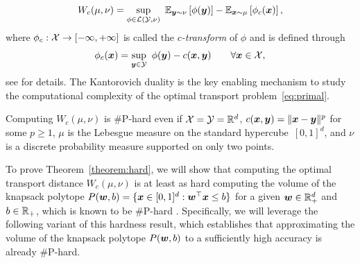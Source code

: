 \documentclass[11pt, a4paper, oneside, reqno]{article}
\begin{document}
	\begin{equation}
	\label{eq:ctans_dual}
	W_c(\mu, \nu) =\sup_{\phi \in \mathcal{L}(\mathcal{Y}, \nu)} ~ \displaystyle \mathbb{E}_{\boldsymbol y \sim \nu}\left[\phi(\boldsymbol y)\right] - \mathbb{E}_{\boldsymbol x \sim \mu}\left[ \phi_c(\boldsymbol x) \right],
	\end{equation}
	where $\phi_c:\mathcal{X}\rightarrow [-\infty,+\infty]$ is called the \textit{$c$-transform} of $\phi$ and is defined through
	\begin{equation}
	\label{eq:$c$-transform}
	\phi_c(\boldsymbol x) = \sup_{\boldsymbol y \in \mathcal{Y}} ~ \phi(\boldsymbol y) - c(\boldsymbol x, \boldsymbol y) \qquad \forall \boldsymbol x \in \mathcal{X},
	\end{equation}
	see \citet[\S~5]{villani} for details. The Kantorovich duality is the key enabling mechanism to study the computational complexity of the optimal transport problem~\eqref{eq:primal}. 
	
	\begin{theorem}
		\label{theorem:hard}
		Computing $W_c(\mu, \nu)$ is \#P-hard even if $\mathcal{X}=\mathcal{Y}=\mathbb{R}^d$, $c(\boldsymbol x, \boldsymbol y) = \|\boldsymbol x-\boldsymbol y\|^{p}$ for some $p\geq 1$, $\mu$ is the Lebesgue measure on the standard hypercube~$[0,1]^d$, and $\nu$ is a discrete probability measure supported on only two points.
	\end{theorem}
	
	
	
	To prove Theorem~\ref{theorem:hard}, we will show that computing the optimal transport distance $W_c(\mu, \nu)$ is at least as hard computing the volume of the knapsack polytope $P( \boldsymbol{w}, b) = \{\boldsymbol x\in [0,1]^d :  \boldsymbol{w}^\top  \boldsymbol x\leq b\}$ for a given $\boldsymbol{w}\in \mathbb{R}^d_+$ and $ b \in \mathbb{R}_+$, which is known to be $\#$P-hard \citep[Theorem~1]{dyer1988complexity}. Specifically, we will leverage the following variant of this hardness result, which establishes that approximating the volume of the knapsack polytope $P( \boldsymbol{w}, b)$ to a sufficiently high accuracy is already $\#$P-hard.
	
\end{document}
